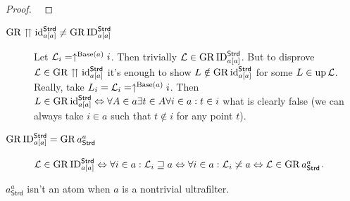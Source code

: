 \begin{proof}
~\end{proof}
\begin{description}
\item [{$\operatorname{GR}\upuparrows\operatorname{id}_{a[a]}^{\mathsf{Strd}}\neq\operatorname{GR}\operatorname{ID}_{a[a]}^{\mathsf{Strd}}$}] Let
$\mathcal{L}_{i}=\uparrow^{\operatorname{Base}(a)}i$. Then trivially $\mathcal{L}\in\operatorname{GR}\operatorname{ID}_{a[a]}^{\mathsf{Strd}}$.
But to disprove $\mathcal{L}\in\operatorname{GR}\upuparrows\operatorname{id}_{a[a]}^{\mathsf{Strd}}$
it's enough to show $L\notin\operatorname{GR}\operatorname{id}_{a[a]}^{\mathsf{Strd}}$ for some
$L\in\operatorname{up}\mathcal{L}$. Really, take $L_{i}=\mathcal{L}_{i}=\uparrow^{\operatorname{Base}(a)}i$.
Then $L\in\operatorname{GR}\operatorname{id}_{a[a]}^{\mathsf{Strd}}\Leftrightarrow\forall A\in a\exists t\in A\forall i\in a:t\in i$
what is clearly false (we can always take $i\in a$ such that $t\notin i$
for any point $t$).
\item [{$\operatorname{GR}\operatorname{ID}_{a[a]}^{\mathsf{Strd}}=\operatorname{GR} a_{\mathsf{Strd}}^{a}$}] $\mathcal{L}\in\operatorname{GR}\operatorname{ID}_{a[a]}^{\mathsf{Strd}}\Leftrightarrow\forall i\in a:\mathcal{L}_{i}\sqsupseteq a\Leftrightarrow\forall i\in a:\mathcal{L}_{i}\not\asymp a\Leftrightarrow\mathcal{L}\in\operatorname{GR} a_{\mathsf{Strd}}^{a}$.\end{description}
\begin{cor}
$a_{\mathsf{Strd}}^{a}$ isn't an atom when $a$ is a nontrivial ultrafilter.
\end{cor}

